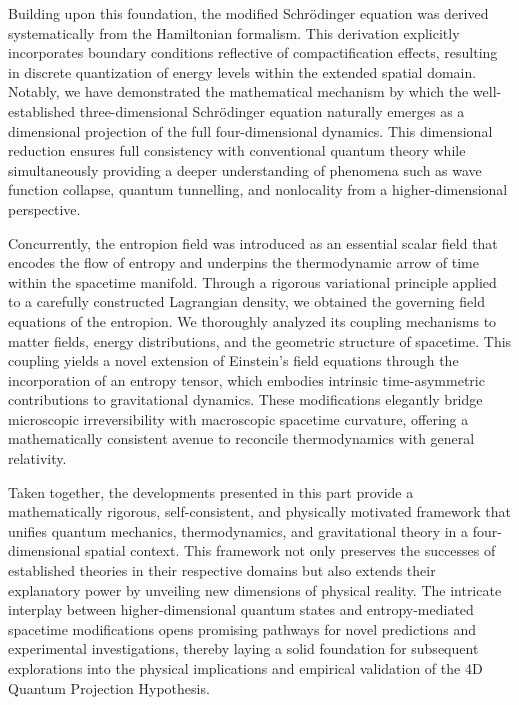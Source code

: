 \documentclass[12pt]{article}
\begin{document}
Building upon this foundation, the modified Schrödinger equation was derived systematically from the Hamiltonian formalism. This derivation explicitly incorporates boundary conditions reflective of compactification effects, resulting in discrete quantization of energy levels within the extended spatial domain. Notably, we have demonstrated the mathematical mechanism by which the well-established three-dimensional Schrödinger equation naturally emerges as a dimensional projection of the full four-dimensional dynamics. This dimensional reduction ensures full consistency with conventional quantum theory while simultaneously providing a deeper understanding of phenomena such as wave function collapse, quantum tunnelling, and nonlocality from a higher-dimensional perspective.

Concurrently, the entropion field was introduced as an essential scalar field that encodes the flow of entropy and underpins the thermodynamic arrow of time within the spacetime manifold. Through a rigorous variational principle applied to a carefully constructed Lagrangian density, we obtained the governing field equations of the entropion. We thoroughly analyzed its coupling mechanisms to matter fields, energy distributions, and the geometric structure of spacetime. This coupling yields a novel extension of Einstein’s field equations through the incorporation of an entropy tensor, which embodies intrinsic time-asymmetric contributions to gravitational dynamics. These modifications elegantly bridge microscopic irreversibility with macroscopic spacetime curvature, offering a mathematically consistent avenue to reconcile thermodynamics with general relativity.

Taken together, the developments presented in this part provide a mathematically rigorous, self-consistent, and physically motivated framework that unifies quantum mechanics, thermodynamics, and gravitational theory in a four-dimensional spatial context. This framework not only preserves the successes of established theories in their respective domains but also extends their explanatory power by unveiling new dimensions of physical reality. The intricate interplay between higher-dimensional quantum states and entropy-mediated spacetime modifications opens promising pathways for novel predictions and experimental investigations, thereby laying a solid foundation for subsequent explorations into the physical implications and empirical validation of the 4D Quantum Projection Hypothesis.
\end{document}
